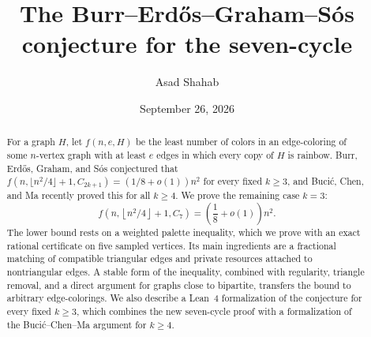 \documentclass[11pt,reqno]{amsart}
\title[The Burr--Erd\H{o}s--Graham--S\'os conjecture for the seven-cycle]{The Burr--Erd\H{o}s--Graham--S\'os conjecture for the seven-cycle}
\author[The Burr--Erd\H{o}s--Graham--S\'os conjecture for the seven-cycle]{Asad Shahab}
\date{September 26, 2026}
\numberwithin{equation}{section}
\theoremstyle{definition}
\theoremstyle{remark}
\begin{document}
\begin{abstract}
For a graph $H$, let $f(n,e,H)$ be the least number of colors in an edge-coloring of some $n$-vertex graph with at least $e$ edges in which every copy of $H$ is rainbow. Burr, Erd\H{o}s, Graham, and S\'os conjectured that $f(n,\lfloor n^2/4\rfloor+1,C_{2k+1})=(1/8+o(1))n^2$ for every fixed $k\ge3$, and Buci\'c, Chen, and Ma recently proved this for all $k\ge4$. We prove the remaining case $k=3$:
\[
 f\left(n,\left\lfloor n^2/4\right\rfloor+1,C_7\right)
 =\left(\frac18+o(1)\right)n^2.
\]
The lower bound rests on a weighted palette inequality, which we prove with an exact rational certificate on five sampled vertices. Its main ingredients are a fractional matching of compatible triangular edges and private resources attached to nontriangular edges. A stable form of the inequality, combined with regularity, triangle removal, and a direct argument for graphs close to bipartite, transfers the bound to arbitrary edge-colorings. We also describe a Lean~4 formalization of the conjecture for every fixed $k\ge3$, which combines the new seven-cycle proof with a formalization of the Buci\'c--Chen--Ma argument for $k\ge4$.
\end{abstract}
\maketitle











\clearpage
\appendix

\clearpage


\end{document}
